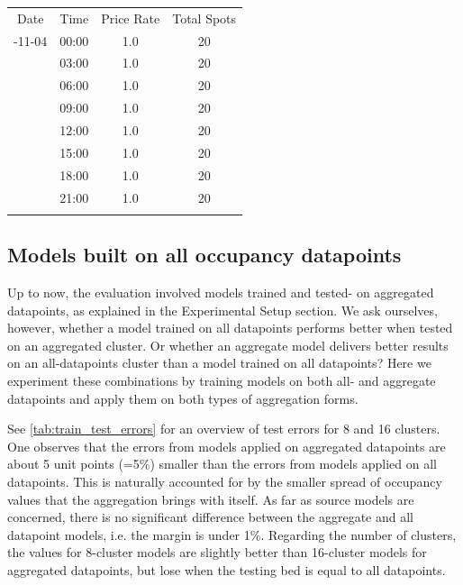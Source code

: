 \documentclass{ws-ijait}
\newcommand{\cmmnt}[1]{\ignorespaces}
\begin{document}
	\begin{table}
		{\begin{tabular}{cccc}	
				\toprule
				Date & Time & Price Rate & Total Spots \\
				\colrule
				2017-11-04 & 	00:00 & 1.0 & 20 \\
				& 	03:00 & 1.0 & 20 \\
				& 	06:00 & 1.0 & 20 \\
				& 	09:00 & 1.0 & 20 \\
				& 	12:00 & 1.0 & 20 \\
				& 	15:00 & 1.0 & 20 \\
				& 	18:00 & 1.0 & 20 \\
				& 	21:00 & 1.0 & 20 \\
				\botrule
		\end{tabular}}
		\label{tab:ml_cwout}
	\end{table}
				
	\subsection{Models built on all occupancy datapoints}
	Up to now, the evaluation involved models trained and tested- on aggregated datapoints, as explained in \cmmnt{\cref{experimental_setup:aggregating_training_data}} the Experimental Setup section. 
	We ask ourselves, however, whether a model trained on all datapoints performs better when tested on an aggregated cluster. Or whether an aggregate model delivers better results on an all-datapoints cluster than a model trained on all datapoints? Here we experiment these combinations by training models on both all- and aggregate datapoints and apply them on both types of aggregation forms. 
	
	See \cref{tab:train_test_errors} for an overview of test errors for 8 and 16 clusters. One observes that the errors from models applied on aggregated datapoints are about 5 unit points (=5\%) smaller than the errors from models applied on all datapoints. This is naturally accounted for by the smaller spread of occupancy values that the aggregation brings with itself. As far as source models are concerned, there is no significant difference between the aggregate and all datapoint models, i.e. the margin is under 1\%. Regarding the number of clusters, the values for 8-cluster models are slightly better than 16-cluster models for aggregated datapoints, but lose when the testing bed is equal to all datapoints.
	
\end{document}
